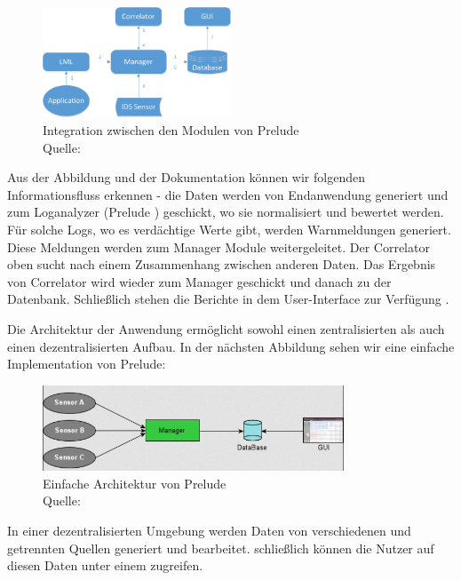 \begin{figure}[H]
   \centering
   \includegraphics[width=0.5\textwidth]{assets/2_p3.png}
   \caption[Integration zwischen den Modulen von Prelude ]
   {Integration zwischen den Modulen von Prelude \\Quelle: \citep{Prelude_MU} }
   \centering
\end{figure}

Aus der Abbildung und der Dokumentation können wir folgenden Informationsfluss erkennen - die Daten werden von Endanwendung generiert und zum Loganalyzer (Prelude ) geschickt, wo sie normalisiert und bewertet werden. Für solche Logs, wo es verdächtige Werte gibt, werden Warnmeldungen generiert. Diese Meldungen werden zum Manager Module weitergeleitet. Der Correlator oben sucht nach einem Zusammenhang zwischen anderen Daten. Das Ergebnis von Correlator wird wieder zum Manager geschickt und danach zu der Datenbank. Schließlich stehen die Berichte in dem User-Interface zur Verfügung \citep{Prelude_Doc}.

Die Architektur der Anwendung ermöglicht sowohl einen zentralisierten als auch einen dezentralisierten Aufbau. In der nächsten Abbildung sehen wir eine einfache Implementation von Prelude:

\begin{figure}[H]
   \centering
   \includegraphics[width=0.8\textwidth]{assets/2_p4.png}
   \caption[Einfache Architektur von Prelude ]
   {Einfache Architektur von Prelude \\Quelle: \citep{Prelude_MU} }
   \centering
\end{figure}

In einer dezentralisierten Umgebung werden Daten von verschiedenen und getrennten Quellen generiert und bearbeitet. schließlich können die Nutzer auf diesen Daten unter einem  zugreifen.

